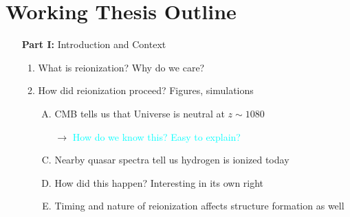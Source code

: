 \documentclass[11pt]{article}
\begin{document}
\section*{Working Thesis Outline}

\begin{enumerate}
\item [{\bf Part I:}] Introduction and Context
\begin{enumerate}[1.]
\item What is reionization? Why do we care?
\item How did reionization proceed? Figures, simulations
\begin{enumerate}[A.]
\item CMB tells us that Universe is neutral at $z \sim 1080$
\item [$\to$] \textcolor{cyan}{How do we know this? Easy to explain?}
\item Nearby quasar spectra tell us hydrogen is ionized today
\item How did this happen? Interesting in its own right
\item Timing and nature of reionization affects structure formation as well
\end{enumerate}



\end{enumerate}
\end{enumerate}
\end{document}
